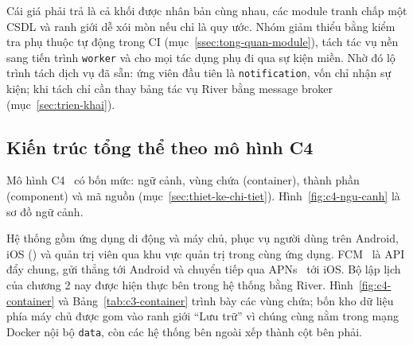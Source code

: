 Cái giá phải trả là cả khối được nhân bản cùng nhau, các module tranh chấp một CSDL và ranh giới dễ xói mòn nếu chỉ là quy ước. Nhóm giảm thiểu bằng kiểm tra phụ thuộc tự động trong CI (mục~\ref{ssec:tong-quan-module}), tách tác vụ nền sang tiến trình \texttt{worker} và cho mọi tác dụng phụ đi qua sự kiện miền. Nhờ đó lộ trình tách dịch vụ đã sẵn: ứng viên đầu tiên là \texttt{notification}, vốn chỉ nhận sự kiện; khi tách chỉ cần thay bảng tác vụ River bằng message broker (mục~\ref{sec:trien-khai}).

\subsection{Kiến trúc tổng thể theo mô hình C4}\label{ssec:c4-tong-the}

Mô hình C4~\cite{c4model} có bốn mức: ngữ cảnh, vùng chứa (container), thành phần (component) và mã nguồn (mục~\ref{sec:thiet-ke-chi-tiet}). Hình~\ref{fig:c4-ngu-canh} là sơ đồ ngữ cảnh.


Hệ thống gồm ứng dụng di động và máy chủ, phục vụ người dùng trên Android, iOS () và quản trị viên qua khu vực quản trị trong cùng ứng dụng. FCM~\cite{fcm} là API đẩy chung, gửi thẳng tới Android và chuyển tiếp qua APNs~\cite{apns} tới iOS. Bộ lập lịch của chương 2 nay được hiện thực bên trong hệ thống bằng River. Hình~\ref{fig:c4-container} và Bảng~\ref{tab:c3-container} trình bày các vùng chứa; bốn kho dữ liệu phía máy chủ được gom vào ranh giới “Lưu trữ” vì chúng cùng nằm trong mạng Docker nội bộ \texttt{data}, còn các hệ thống bên ngoài xếp thành cột bên phải.


